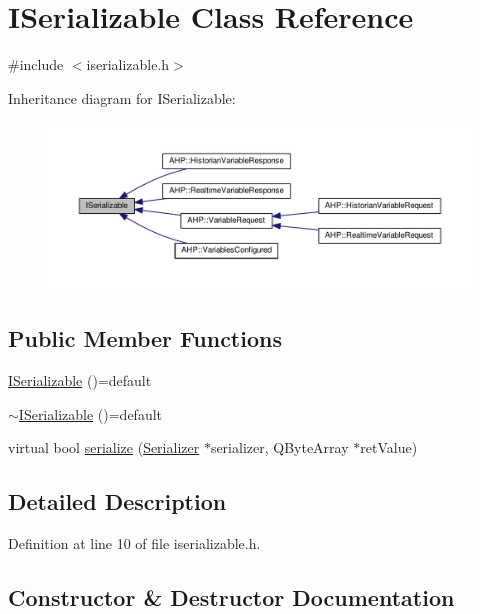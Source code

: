 \hypertarget{class_i_serializable}{}\section{I\+Serializable Class Reference}
\label{class_i_serializable}


{\ttfamily \#include $<$iserializable.\+h$>$}



Inheritance diagram for I\+Serializable\+:
\nopagebreak
\begin{figure}[H]
\begin{center}
\leavevmode
\includegraphics[width=350pt]{class_i_serializable__inherit__graph}
\end{center}
\end{figure}
\subsection*{Public Member Functions}
\begin{DoxyCompactItemize}
\item 
\hyperlink{class_i_serializable_ace65707ac82fe464a6c7b0b2ffed394c}{I\+Serializable} ()=default
\item 
\hyperlink{class_i_serializable_a9a72fc4c1c67eb10b0feaa17e03ccab2}{$\sim$\+I\+Serializable} ()=default
\item 
virtual bool \hyperlink{class_i_serializable_afad8ad3e1cd1ecaa583cf92a19aa0ef0}{serialize} (\hyperlink{class_serializer}{Serializer} $\ast$serializer, Q\+Byte\+Array $\ast$ret\+Value)
\end{DoxyCompactItemize}


\subsection{Detailed Description}


Definition at line 10 of file iserializable.\+h.



\subsection{Constructor \& Destructor Documentation}
\hypertarget{class_i_serializable_ace65707ac82fe464a6c7b0b2ffed394c}{}
